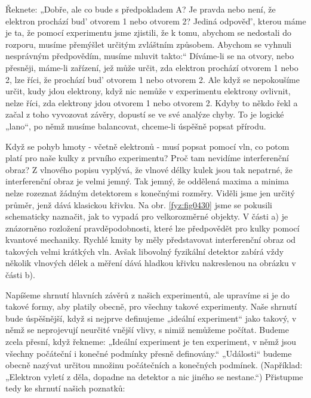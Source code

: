     Řeknete: „Dobře, ale co bude s předpokladem A? Je pravda nebo není, že elektron prochází bud'
    otvorem 1 nebo otvorem 2? Jediná odpověď', kterou máme je ta, že pomocí experimentu jsme
    zjistili, že k tomu, abychom se nedostali do rozporu, musíme přemýšlet určitým zvláštním
    způsobem. Abychom se vyhnuli nesprávným předpovědím, musíme mluvit takto:“ Díváme-li se na
    otvory, nebo přesněji, máme-li zařízení, jež může určit, zda elektron prochází otvorem 1 nebo 2,
    lze říci, že prochází bud' otvorem 1 nebo otvorem 2. Ale když se nepokoušíme určit, kudy jdou
    elektrony, když nic nemůže v experimentu elektrony ovlivnit, nelze říci, zda elektrony jdou
    otvorem 1 nebo otvorem 2. Kdyby to někdo řekl a začal z toho vyvozovat závěry, dopustí se ve své
    analýze chyby. To je logické „lano“, po němž musíme balancovat, chceme-li úspěšně popsat
    přírodu.

    Když se pohyb hmoty - včetně elektronů - musí popsat pomocí vln, co potom platí pro naše kulky z
    prvního experimentu? Proč tam nevidíme interferenční obraz? Z vlnového popisu vyplývá, že vlnové
    délky kulek jsou tak nepatrné, že interferenční obraz je velmi jemný. Tak jemný, že oddělená
    maxima a minima nelze rozeznat žádným detektorem s konečnými rozměry. Viděli jsme jen určitý
    průměr, jenž dává klasickou křivku. Na obr. \ref{fyz:fig0430} jsme se pokusili schematicky
    naznačit, jak to vypadá pro velkorozměrné objekty. V části a) je znázorněno rozložení
    pravděpodobnosti, které lze předpovědět pro kulky pomocí kvantové mechaniky. Rychlé kmity by
    měly představovat interferenční obraz od takových velmi krátkých vln. Avšak libovolný fyzikální
    detektor zabírá vždy několik vlnových délek a měření dává hladkou křivku nakreslenou na obrázku
    v části b).

    Napíšeme shrnutí hlavních závěrů z našich experimentů, ale upravíme si je do takové formy, aby
    platily obecně, pro všechny takové experimenty. Naše shrnutí bude úspěšnější, když si nejprve
    definujeme „ideální experiment“ jako takový, v němž se neprojevují neurčité vnější vlivy, s
    nimiž nemůžeme počítat. Budeme zcela přesní, když řekneme: „Ideální experiment je ten
    experiment, v němž jsou všechny počáteční i konečné podmínky přesně definovány.“ „Události“
    budeme obecně nazývat určitou množinu počátečních a konečných podmínek. (Například: „Elektron
    vyletí z děla, dopadne na detektor a nic jiného se nestane.“) Přistupme tedy ke shrnutí našich
    poznatků:
        
